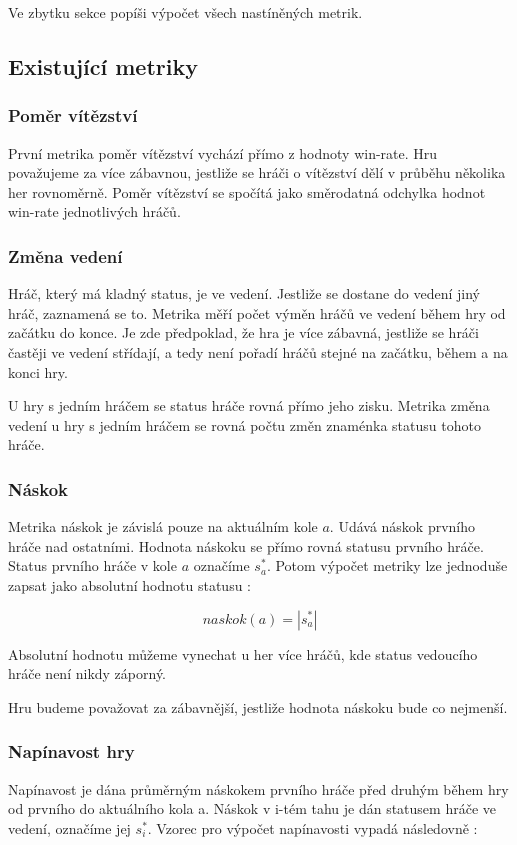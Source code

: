 Ve zbytku sekce popíši výpočet všech nastíněných metrik.

\subsection{Existující metriky}

\subsubsection{Poměr vítězství}

První metrika poměr vítězství vychází přímo z hodnoty win-rate. Hru považujeme za více zábavnou, jestliže se hráči o vítězství dělí v průběhu několika her rovnoměrně. Poměr vítězství se spočítá jako směrodatná odchylka hodnot win-rate jednotlivých hráčů.

\subsubsection{Změna vedení}

Hráč, který má kladný status, je ve vedení. Jestliže se dostane do vedení jiný hráč, zaznamená se to. Metrika měří počet výměn hráčů ve vedení během hry od začátku do konce. Je zde předpoklad, že hra je více zábavná, jestliže se hráči častěji ve vedení střídají, a tedy není pořadí hráčů stejné na začátku, během a na konci hry. 

U hry s jedním hráčem se status hráče rovná přímo jeho zisku. Metrika změna vedení u hry s jedním hráčem se rovná počtu změn znaménka statusu tohoto hráče.

\subsubsection{Náskok}

Metrika náskok je závislá pouze na aktuálním kole $a$. Udává náskok prvního hráče nad ostatními. Hodnota náskoku se přímo rovná statusu prvního hráče. Status prvního hráče v kole $a$ označíme $s^*_a$. Potom výpočet metriky lze jednoduše zapsat jako absolutní hodnotu statusu :

	\[
	naskok(a) = |s^*_a|
\]

Absolutní hodnotu můžeme vynechat u her více hráčů, kde status vedoucího hráče není nikdy záporný.

Hru budeme považovat za zábavnější, jestliže hodnota náskoku bude co nejmenší.

\subsubsection{Napínavost hry}
Napínavost je dána průměrným náskokem prvního hráče před druhým během hry od prvního do aktuálního kola a. Náskok v i-tém tahu je dán statusem hráče ve vedení, označíme jej $s^*_i$. Vzorec pro výpočet napínavosti vypadá následovně :


